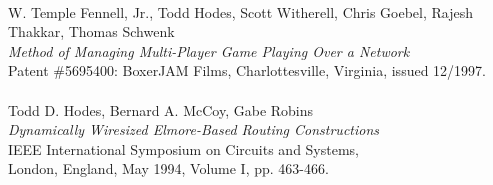 \begin{tabbing}
\smallskip \\
\>	W. Temple Fennell, Jr., Todd Hodes, Scott Witherell, Chris Goebel, 
	Rajesh Thakkar, Thomas Schwenk \\
\>\>	{\it Method of Managing Multi-Player Game Playing Over a Network}  \\
\>\>	Patent \#5695400: BoxerJAM Films, Charlottesville, Virginia, issued 12/1997.  \\
\smallskip \\
\>    Todd D. Hodes, Bernard A. McCoy, Gabe Robins \\
\>\>  {\it Dynamically Wiresized Elmore-Based Routing Constructions}  \\
\> IEEE International Symposium on Circuits and Systems, \\
\>\>   London, England, May 1994, Volume I, pp. 463-466. \\
\end{tabbing}








